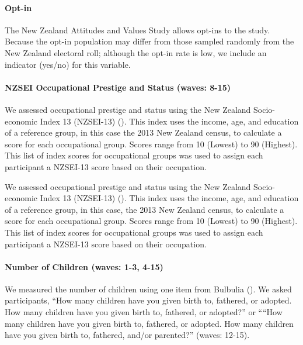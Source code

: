 \documentclass[
  single column]{article}
\let\oldparagraph\paragraph
\renewcommand{\paragraph}[1]{\oldparagraph{#1}\mbox{}}
\begin{document}
\paragraph{Opt-in}\label{opt-in}

The New Zealand Attitudes and Values Study allows opt-ins to the study.
Because the opt-in population may differ from those sampled randomly
from the New Zealand electoral roll; although the opt-in rate is low, we
include an indicator (yes/no) for this variable.

\paragraph{NZSEI Occupational Prestige and Status (waves:
8-15)}\label{nzsei-occupational-prestige-and-status-waves-8-15}

We assessed occupational prestige and status using the New Zealand
Socio-economic Index 13 (NZSEI-13) (). This index uses the income, age, and education of
a reference group, in this case the 2013 New Zealand census, to
calculate a score for each occupational group. Scores range from 10
(Lowest) to 90 (Highest). This list of index scores for occupational
groups was used to assign each participant a NZSEI-13 score based on
their occupation.

We assessed occupational prestige and status using the New Zealand
Socio-economic Index 13 (NZSEI-13) (). This index uses the income, age, and education of
a reference group, in this case, the 2013 New Zealand census, to
calculate a score for each occupational group. Scores range from 10
(Lowest) to 90 (Highest). This list of index scores for occupational
groups was used to assign each participant a NZSEI-13 score based on
their occupation.

\paragraph{Number of Children (waves: 1-3,
4-15)}\label{number-of-children-waves-1-3-4-15}

We measured the number of children using one item from Bulbulia
(). We asked participants, ``How many
children have you given birth to, fathered, or adopted. How many
children have you given birth to, fathered, or adopted?'' or ````How
many children have you given birth to, fathered, or adopted. How many
children have you given birth to, fathered, and/or parented?'' (waves:
12-15).
\end{document}
